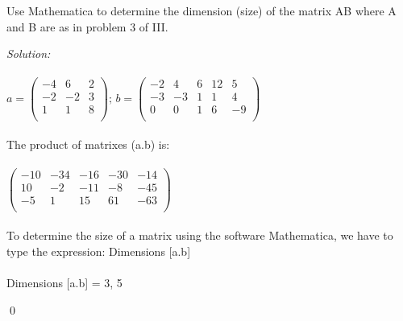 \documentclass[12pt]{article}
\newenvironment{problem}[2][Problem]{\begin{trivlist}
\item[\hskip \labelsep {\bfseries #1}\hskip \labelsep {\bfseries #2.}]}{\end{trivlist}}
\newenvironment{sol}
    {\emph{Solution:}
    }
    {
    \qed
    }
\begin{document}
\begin{problem}{IV}
Use Mathematica to determine the dimension (size) of the matrix AB where A and B are as in problem 3 of III.
\end{problem}
\begin{sol}\\ \\
$a = \left(
\begin{array}{ccc}
 -4 & 6 & 2 \\
 -2 & -2 & 3 \\
 1 & 1 & 8 \\
\end{array}
\right) \text{; } b =\left(
\begin{array}{ccccc}
 -2 & 4 & 6 & 12 & 5 \\
 -3 & -3 & 1 & 1 & 4 \\
 0 & 0 & 1 & 6 & -9 \\
\end{array}
\right)$ \\ \\
The product of matrixes (a.b) is: \\ \\
$\left(
\begin{array}{ccccc}
 -10 & -34 & -16 & -30 & -14 \\
 10 & -2 & -11 & -8 & -45 \\
 -5 & 1 & 15 & 61 & -63 \\
\end{array}
\right)$ \\ \\
To determine the size of a matrix using the software Mathematica, we have to type the expression: Dimensions [a.b] \\ \\
Dimensions [a.b] = {3, 5}
\end{sol}
\end{document}
